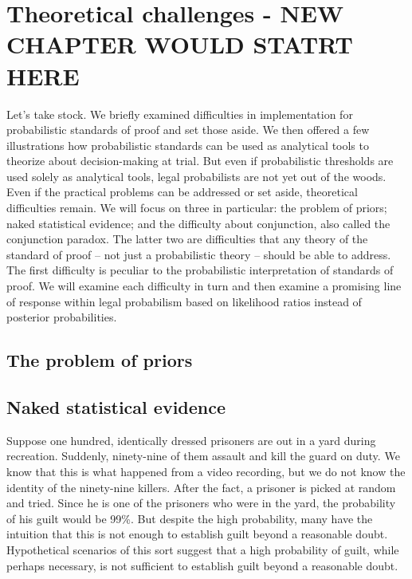 \documentclass[
  10pt,
  dvipsnames,enabledeprecatedfontcommands]{scrartcl}
\begin{document}
\hypertarget{theoretical-challenges---new-chapter-would-statrt-here}{%
\section{Theoretical challenges - NEW CHAPTER WOULD STATRT
HERE}\label{theoretical-challenges---new-chapter-would-statrt-here}}

Let's take stock. We briefly examined difficulties in implementation for
probabilistic standards of proof and set those aside. We then offered a
few illustrations how probabilistic standards can be used as analytical
tools to theorize about decision-making at trial. But even if
probabilistic thresholds are used solely as analytical tools, legal
probabilists are not yet out of the woods. Even if the practical
problems can be addressed or set aside, theoretical difficulties remain.
We will focus on three in particular: the problem of priors; naked
statistical evidence; and the difficulty about conjunction, also called
the conjunction paradox. The latter two are difficulties that any theory
of the standard of proof -- not just a probabilistic theory -- should be
able to address. The first difficulty is peculiar to the probabilistic
interpretation of standards of proof. We will examine each difficulty in
turn and then examine a promising line of response within legal
probabilism based on likelihood ratios instead of posterior
probabilities.

\hypertarget{the-problem-of-priors}{%
\subsection{The problem of priors}\label{the-problem-of-priors}}

\hypertarget{naked-statistical-evidence}{%
\subsection{Naked statistical
evidence}\label{naked-statistical-evidence}}

Suppose one hundred, identically dressed prisoners are out in a yard
during recreation. Suddenly, ninety-nine of them assault and kill the
guard on duty. We know that this is what happened from a video
recording, but we do not know the identity of the ninety-nine killers.
After the fact, a prisoner is picked at random and tried. Since he is
one of the prisoners who were in the yard, the probability of his guilt
would be 99\%. But despite the high probability, many have the intuition
that this is not enough to establish guilt beyond a reasonable doubt.
Hypothetical scenarios of this sort suggest that a high probability of
guilt, while perhaps necessary, is not sufficient to establish guilt
beyond a reasonable doubt.
\end{document}
